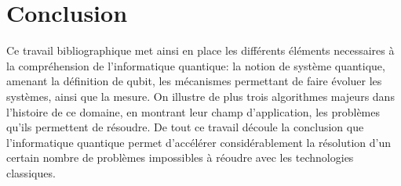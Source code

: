 \chapter{Conclusion}

Ce travail bibliographique met ainsi en place les différents éléments necessaires à la compréhension de l'informatique quantique: la notion de système quantique, amenant la définition de qubit, les mécanismes permettant de faire évoluer les systèmes, ainsi que la mesure. On illustre de plus trois algorithmes majeurs dans l'histoire de ce domaine, en montrant leur champ d'application, les problèmes qu'ils permettent de résoudre. De tout ce travail découle la conclusion que l'informatique quantique permet d'accélérer considérablement la résolution d'un certain nombre de problèmes impossibles à réoudre avec les technologies classiques.